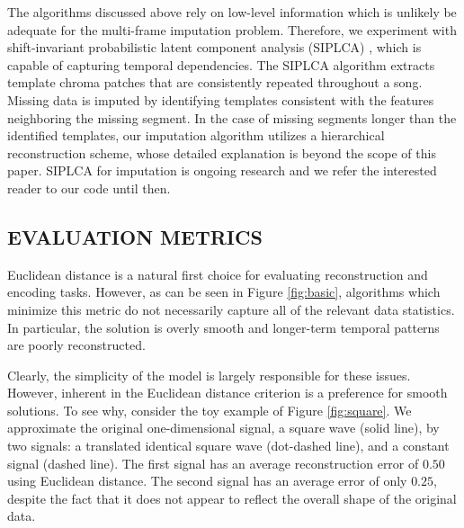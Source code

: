 \documentclass{article}
\newcommand{\FIXME}[2][FIXME]{}%
\begin{document}
The algorithms discussed above rely on low-level information which is
unlikely be adequate for the multi-frame imputation problem.
Therefore, we experiment with shift-invariant probabilistic latent
component analysis (SIPLCA) \cite{Smaragdis2009,Weiss2010}, which is
capable of capturing temporal dependencies.
The SIPLCA algorithm extracts template chroma patches that are
consistently repeated throughout a song.  Missing data is imputed by
identifying templates consistent with the features neighboring the
missing segment.  In the case of missing segments longer than the
identified templates, our imputation algorithm utilizes a hierarchical
reconstruction scheme, whose detailed explanation is beyond the scope
of this paper.  SIPLCA for imputation is ongoing research and we refer
the interested reader to our code until then.


\subsection{EVALUATION METRICS}
\label{ssec:measures}
Euclidean distance is a natural first choice for evaluating
reconstruction and encoding tasks. However, as can be seen in Figure
\ref{fig:basic}, algorithms which minimize this metric do not
necessarily capture all of the relevant data statistics.  In
particular, the solution is overly smooth and longer-term temporal
patterns are poorly reconstructed.

Clearly, the simplicity of the model is largely responsible for these
issues.  However, inherent in the Euclidean distance criterion is a
preference for smooth solutions.
To see why, consider the toy example of Figure \ref{fig:square}. We
approximate the original one-dimensional signal, a square wave (solid
line), by two signals: a translated identical square wave (dot-dashed
line), and a constant signal (dashed line). The first signal has an
average reconstruction error of $0.50$ using Euclidean distance. The
second signal has an average error of only $0.25$, despite the fact
that it does not appear to reflect the overall shape of the original
data.
\end{document}
